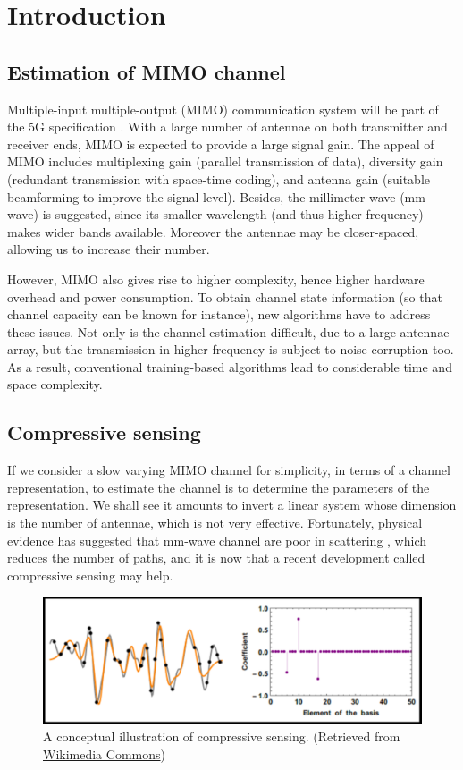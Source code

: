 \chapter {Introduction}

\section {Estimation of MIMO channel}

Multiple-input multiple-output (MIMO) communication system will be part of the 5G specification \cite {RSM13}.
With a large number of antennae on both transmitter and receiver ends, MIMO is expected to provide a large signal gain.
The appeal of MIMO includes multiplexing gain (parallel transmission of data), diversity gain (redundant transmission with space-time coding), and antenna gain (suitable beamforming to improve the signal level).
Besides, the millimeter wave (mm-wave) is suggested, since its smaller wavelength (and thus higher frequency) makes wider bands available.
Moreover the antennae may be closer-spaced, allowing us to increase their number.

However, MIMO also gives rise to higher complexity, hence higher hardware overhead and power consumption.
To obtain channel state information (so that channel capacity can be known for instance), new algorithms have to address these issues.
Not only is the channel estimation difficult, due to a large antennae array, but the transmission in higher frequency is subject to noise corruption too.
As a result, conventional training-based algorithms lead to considerable time and space complexity.


\section {Compressive sensing}

If we consider a slow varying MIMO channel for simplicity, in terms of a channel representation, to estimate the channel is to determine the parameters of the representation.
We shall see it amounts to invert a linear system whose dimension is the number of antennae, which is not very effective.
Fortunately, physical evidence has suggested that mm-wave channel are poor in scattering \cite {ALS14}, which reduces the number of paths, and it is now that a recent development called compressive sensing may help.

\begin {figure} [hbt]
\centering
\includegraphics [width = \textwidth] {compressive-sensing.png}
\caption {
A conceptual illustration of compressive sensing.
(Retrieved from \href {commons.wikimedia.org/wiki/File:Orthogonal_Matching_Pursuit.gif} {Wikimedia Commons})
}
\end {figure}

